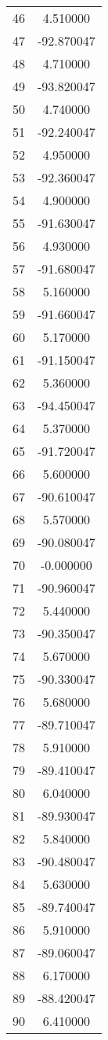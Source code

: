 \documentclass[12pt]{article}
\begin{document}
\begin{longtable}{@{}cc@{}}
46 & 4.510000 \\
47 & -92.870047 \\
48 & 4.710000 \\
49 & -93.820047 \\
50 & 4.740000 \\
51 & -92.240047 \\
52 & 4.950000 \\
53 & -92.360047 \\
54 & 4.900000 \\
55 & -91.630047 \\
56 & 4.930000 \\
57 & -91.680047 \\
58 & 5.160000 \\
59 & -91.660047 \\
60 & 5.170000 \\
61 & -91.150047 \\
62 & 5.360000 \\
63 & -94.450047 \\
64 & 5.370000 \\
65 & -91.720047 \\
66 & 5.600000 \\
67 & -90.610047 \\
68 & 5.570000 \\
69 & -90.080047 \\
70 & -0.000000 \\
71 & -90.960047 \\
72 & 5.440000 \\
73 & -90.350047 \\
74 & 5.670000 \\
75 & -90.330047 \\
76 & 5.680000 \\
77 & -89.710047 \\
78 & 5.910000 \\
79 & -89.410047 \\
80 & 6.040000 \\
81 & -89.930047 \\
82 & 5.840000 \\
83 & -90.480047 \\
84 & 5.630000 \\
85 & -89.740047 \\
86 & 5.910000 \\
87 & -89.060047 \\
88 & 6.170000 \\
89 & -88.420047 \\
90 & 6.410000 \\

\end{longtable}
\end{document}
